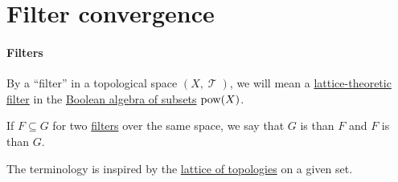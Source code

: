 \section{Filter convergence}\label{sec:filter_convergence}

\paragraph{Filters}

\begin{definition}\label{def:topological_filter}
  By a \enquote{filter} in a topological space \( (X, \mscrT) \), we will mean a \hyperref[def:lattice_ideal]{lattice-theoretic filter} in the \hyperref[thm:boolean_algebra_of_subsets]{Boolean algebra of subsets} \( \operatorname{pow}(X) \).
\end{definition}

\begin{definition}\label{def:filter_ordering}
  If \( F \subseteq G \) for two \hyperref[def:topological_filter]{filters} over the same space, we say that \( G \) is  than \( F \) and \( F \) is  than \( G \).
\end{definition}
\begin{comments}
  \item The terminology is inspired by the \hyperref[def:topological_space_ordering]{lattice of topologies} on a given set.
\end{comments}
